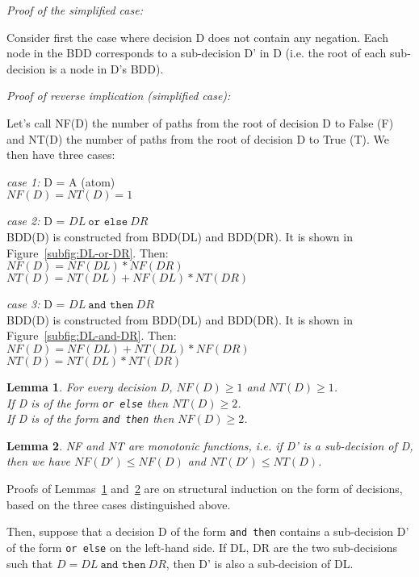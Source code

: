 \documentclass[a4paper,12pt,twoside]{article}
\renewcommand{\le}{\leqslant}
\renewcommand{\ge}{\geqslant}
\newcommand{\andthen}{\texttt{and then}}
\newcommand{\orelse}{\texttt{or else}}
\newtheorem{lemma}{Lemma}[subsection]
\begin{document}
\emph{Proof of the simplified case:}

Consider first the case where decision D does not contain any negation.
Each node in the BDD corresponds to a sub-decision D' in D
(i.e. the root of each sub-decision is a node in D's BDD).

\emph{Proof of reverse implication (simplified case):}

Let's call NF(D) the number of paths from the root of decision D to False (F)
and NT(D) the number of paths from the root of decision D to True (T). We
then have three cases:

\emph{case 1:} D = A (atom)\\
$NF(D) = NT(D) = 1$

\emph{case 2:} D = $DL \ \orelse{} \ DR$\\
BDD(D) is constructed from BDD(DL) and BDD(DR). It is shown 
in Figure~\ref{subfig:DL-or-DR}. Then:\\
$NF(D) = NF(DL) * NF(DR)$\\
$NT(D) = NT(DL) + NF(DL) * NT(DR)$

\emph{case 3:} D = $DL \ \andthen{} \ DR$\\
BDD(D) is constructed from BDD(DL) and BDD(DR). It is shown 
in Figure~\ref{subfig:DL-and-DR}. Then:\\
$NF(D) = NF(DL) + NT(DL) * NF(DR)$\\
$NT(D) = NT(DL) * NT(DR)$

\begin{lemma}
\label{lemma:NF-NT-bound}
For every decision D, $NF(D) \ge 1$ and $NT(D) \ge 1$.\\
If D is of the form \orelse{} then $NT(D) \ge 2$.\\
If D is of the form \andthen{} then $NF(D) \ge 2$.
\end{lemma}

\begin{lemma}
\label{lemma:NF-NT-monotonic}
NF and NT are monotonic functions, i.e. if D' is a sub-decision of D,
then we have
        $NF(D') \le NF(D)$
and        
        $NT(D') \le NT(D)$.
\end{lemma}

Proofs of Lemmas~\ref{lemma:NF-NT-bound} and~\ref{lemma:NF-NT-monotonic} are on
structural induction on the form of decisions, based on the three cases
distinguished above.

Then, suppose that a decision D of the form \andthen{} contains a
sub-decision D' of the form \orelse{} on the left-hand side. If DL, DR
are the two sub-decisions such that $D = DL \ \andthen{} \ DR$, then D' is
also a sub-decision of DL.
\end{document}
